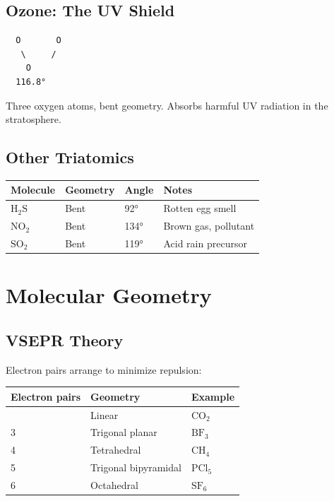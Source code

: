 \documentclass[
  11pt,
  letterpaper,
  twoside,
  openright]{book}
\begin{document}
\subsection{Ozone: The UV Shield}\label{ozone-the-uv-shield}

\begin{verbatim}
  O       O
   \     /
    O
  116.8°
\end{verbatim}

Three oxygen atoms, bent geometry. Absorbs harmful UV radiation in the
stratosphere.

\subsection{Other Triatomics}\label{other-triatomics}

\begin{longtable}[]{@{}llll@{}}
\toprule\noalign{}
Molecule & Geometry & Angle & Notes \\
\midrule\noalign{}
\endhead
\bottomrule\noalign{}
\endlastfoot
\(\text{H}_2\text{S}\) & Bent & 92° & Rotten egg smell \\
\(\text{NO}_2\) & Bent & 134° & Brown gas, pollutant \\
\(\text{SO}_2\) & Bent & 119° & Acid rain precursor \\
\end{longtable}

\section{Molecular Geometry}\label{molecular-geometry}

\subsection{VSEPR Theory}\label{vsepr-theory}

Electron pairs arrange to minimize repulsion:

\begin{longtable}[]{@{}lll@{}}
\toprule\noalign{}
Electron pairs & Geometry & Example \\
\midrule\noalign{}
\endhead
\bottomrule\noalign{}
\endlastfoot
2 & Linear & \(\text{CO}_2\) \\
3 & Trigonal planar & \(\text{BF}_3\) \\
4 & Tetrahedral & \(\text{CH}_4\) \\
5 & Trigonal bipyramidal & \(\text{PCl}_5\) \\
6 & Octahedral & \(\text{SF}_6\) \\
\end{longtable}
\end{document}
